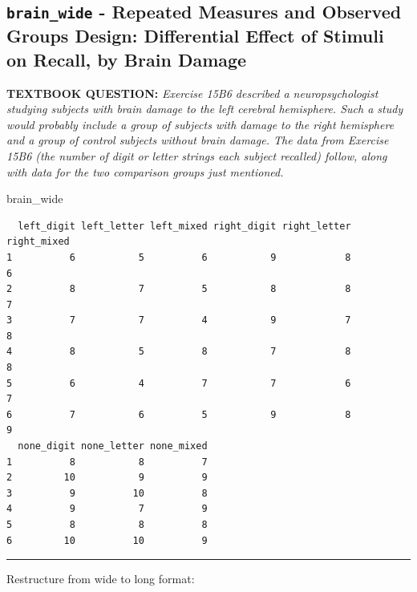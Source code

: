 \documentclass[]{article}
\newenvironment{Shaded}{\begin{snugshade}}{\end{snugshade}}
\newcommand{\NormalTok}[1]{#1}
\begin{document}
\clearpage

\subsection{\texorpdfstring{\texttt{brain\_wide} - Repeated Measures and
Observed Groups Design: Differential Effect of Stimuli on Recall, by
Brain
Damage}{brain\_wide - Repeated Measures and Observed Groups Design: Differential Effect of Stimuli on Recall, by Brain Damage}}\label{brain_wide---repeated-measures-and-observed-groups-design-differential-effect-of-stimuli-on-recall-by-brain-damage}

\textbf{TEXTBOOK QUESTION:} \emph{Exercise 15B6 described a
neuropsychologist studying subjects with brain damage to the left
cerebral hemisphere. Such a study would probably include a group of
subjects with damage to the right hemisphere and a group of control
subjects without brain damage. The data from Exercise 15B6 (the number
of digit or letter strings each subject recalled) follow, along with
data for the two comparison groups just mentioned.}

\begin{Shaded}
\begin{Highlighting}[]
\NormalTok{brain_wide}
\end{Highlighting}
\end{Shaded}

\begin{verbatim}
  left_digit left_letter left_mixed right_digit right_letter right_mixed
1          6           5          6           9            8           6
2          8           7          5           8            8           7
3          7           7          4           9            7           8
4          8           5          8           7            8           8
5          6           4          7           7            6           7
6          7           6          5           9            8           9
  none_digit none_letter none_mixed
1          8           8          7
2         10           9          9
3          9          10          8
4          9           7          9
5          8           8          8
6         10          10          9
\end{verbatim}

\begin{center}\rule{0.5\linewidth}{\linethickness}\end{center}

Restructure from wide to long format:
\end{document}
